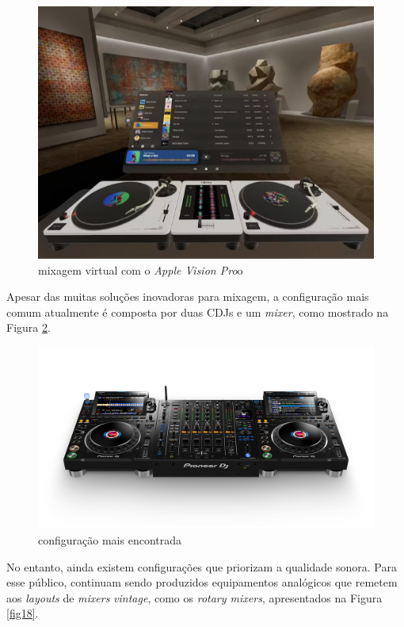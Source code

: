 \begin{figure}[h]
	\centering
    \includegraphics[scale=0.3]{figuras/fig16.eps}
	\caption{mixagem virtual com o \textit{Apple Vision Pro}o \cite{macmagazineDesenvolvedorFala}}
	\label{fig16}
\end{figure}

Apesar das muitas soluções inovadoras para mixagem, a configuração mais comum atualmente é composta por duas CDJs e um \textit{mixer}, como mostrado na Figura \ref{fig17}.

\begin{figure}[h]
	\centering
    \includegraphics[scale=0.3]{figuras/fig17.png}
	\caption{configuração mais encontrada \cite{pioneerdjDJMA94channel}}
	\label{fig17}
\end{figure}

No entanto, ainda existem configurações que priorizam a qualidade sonora. Para esse público, continuam sendo produzidos equipamentos analógicos que remetem aos \textit{layouts} de \textit{mixers} \textit{vintage}, como os \textit{rotary mixers}, apresentados na Figura \ref{fig18}.

